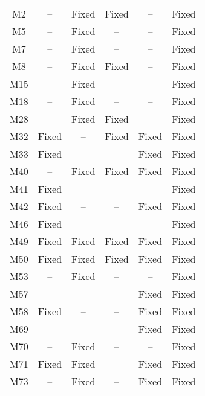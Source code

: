 \begin{table}[!t]
{\begin{tabular}{|c|c|c|c|c|c|}
\hline
M2                & --        & Fixed     & Fixed     & --        &Fixed   \\
M5                & --        & Fixed     & --        & --        &Fixed   \\
M7                & --        & Fixed     & --        & --        &Fixed   \\
M8                & --        & Fixed     & Fixed     & --        &Fixed   \\
M15               & --        & Fixed     & --        & --        &Fixed   \\
M18               & --        & Fixed     & --        & --        &Fixed   \\
M28               & --        & Fixed     & Fixed     & --        &Fixed   \\
M32               & Fixed     & --        & Fixed     & Fixed     &Fixed   \\
M33               & Fixed     & --        & --        & Fixed     &Fixed   \\
M40               & --        & Fixed     & Fixed     & Fixed     &Fixed   \\
M41               & Fixed     & --        & --        & --        &Fixed   \\
M42               & Fixed     & --        & --        & Fixed     &Fixed   \\
M46               & Fixed     & --        & --        & --        &Fixed   \\
M49               & Fixed     & Fixed     & Fixed     & Fixed     &Fixed   \\
M50               & Fixed     & Fixed     & Fixed     & Fixed     &Fixed   \\
M53               & --        & Fixed     & --        & --        &Fixed   \\
M57               & --        & --        & --        & Fixed     &Fixed   \\
M58               & Fixed     & --        & --        & Fixed     &Fixed   \\
M69               & --        & --        & --        & Fixed     &Fixed   \\
M70               & --        & Fixed     & --        & --        &Fixed   \\
M71               & Fixed     & Fixed     & --        & Fixed     &Fixed   \\
M73               & --        & Fixed     & --        & Fixed     &Fixed   \\

\end{tabular}}
\end{table}

